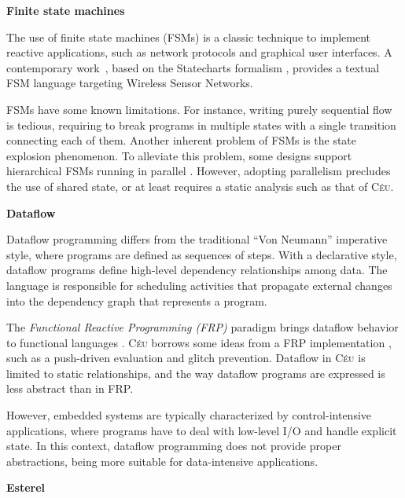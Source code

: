 \documentclass{sigplan-proc}
\newcommand{\2}{\;\;}
\newcommand{\5}{\;\;\;\;\;}
\newcommand{\CEU}{\textsc{C\'{e}u}}
\begin{document}
\textbf{Finite state machines}

The use of finite state machines (FSMs) is a classic technique to implement
reactive applications, such as network protocols and graphical user interfaces.
A contemporary work~\cite{wsn.osm}, based on the Statecharts formalism 
\cite{statecharts.visual}, provides a textual FSM language targeting Wireless 
Sensor Networks.

FSMs have some known limitations.
For instance, writing purely sequential flow is tedious, requiring to break 
programs in multiple states with a single transition connecting each of them.  
Another inherent problem of FSMs is the state explosion phenomenon.
To alleviate this problem, some designs support hierarchical FSMs running in 
parallel \cite{wsn.osm}.
However, adopting parallelism precludes the use of shared state, or at least 
requires a static analysis such as that of \CEU{}.



\textbf{Dataflow}

Dataflow programming \cite{lustre.ieee91,lucid} differs from the traditional 
``Von Neumann'' imperative style, where programs are defined as sequences of 
steps.
With a declarative style, dataflow programs define high-level dependency 
relationships among data.
The language is responsible for scheduling activities that propagate external 
changes into the dependency graph that represents a program.

The \emph{Functional Reactive Programming (FRP)} paradigm brings dataflow 
behavior to functional languages \cite{frp.principles}.
\CEU{} borrows some ideas from a FRP implementation \cite{frtime.embedding}, 
such as a push-driven evaluation and glitch prevention.
Dataflow in \CEU{} is limited to static relationships, and the way dataflow 
programs are expressed is less abstract than in FRP.

However, embedded systems are typically characterized by control-intensive 
applications, where programs have to deal with low-level I/O and handle 
explicit state.
In this context, dataflow programming does not provide proper abstractions, 
being more suitable for data-intensive applications.

\textbf{Esterel}
\end{document}
